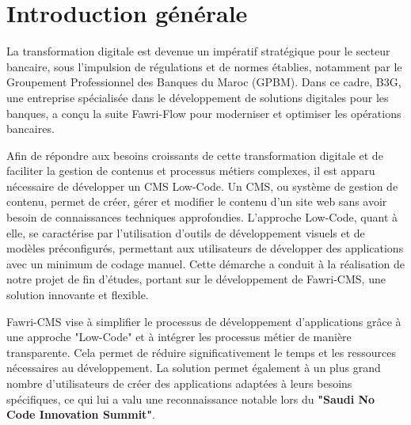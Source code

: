 \chapter*{Introduction générale}


\label{chap: Conclusion générale}
\bf \normalfont

\hspace{\parindent}La transformation digitale est devenue un impératif stratégique pour le secteur bancaire, sous l'impulsion de régulations et de normes établies, notamment par le Groupement Professionnel des Banques du Maroc (GPBM). Dans ce cadre, B3G, une entreprise spécialisée dans le développement de solutions digitales pour les banques, a conçu la suite Fawri-Flow pour moderniser et optimiser les opérations bancaires.

Afin de répondre aux besoins croissants de cette transformation digitale et de faciliter la gestion de contenus et processus métiers complexes, il est apparu nécessaire de développer un CMS Low-Code. Un CMS, ou système de gestion de contenu, permet de créer, gérer et modifier le contenu d'un site web sans avoir besoin de connaissances techniques approfondies. L'approche Low-Code, quant à elle, se caractérise par l'utilisation d'outils de développement visuels et de modèles préconfigurés, permettant aux utilisateurs de développer des applications avec un minimum de codage manuel. Cette démarche a conduit à la réalisation de notre projet de fin d'études, portant sur le développement de Fawri-CMS, une solution innovante et flexible.

Fawri-CMS vise à simplifier le processus de développement d'applications grâce à une approche "Low-Code" et à intégrer les processus métier de manière transparente. Cela permet de réduire significativement le temps et les ressources nécessaires au développement. La solution permet également à un plus grand nombre d'utilisateurs de créer des applications adaptées à leurs besoins spécifiques, ce qui lui a valu une reconnaissance notable lors du \textbf{"Saudi No Code Innovation Summit"}.

